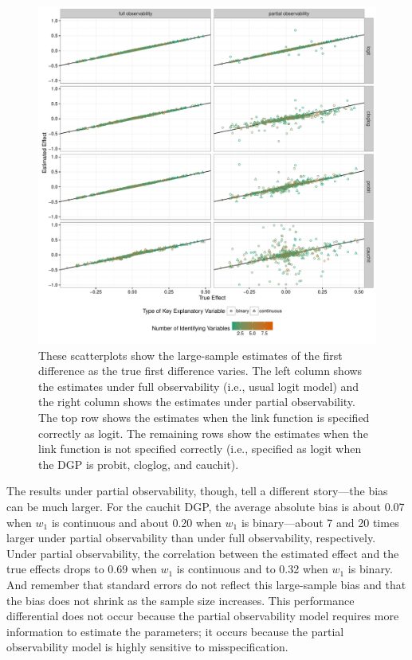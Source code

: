 \documentclass[10pt]{article}
\begin{document}
\begin{figure}[h]
\begin{center}
\includegraphics[scale = .6]{figs/link-sims-scatter.pdf}
\caption{These scatterplots show the large-sample estimates of the first difference as the true first difference varies. The left column shows the estimates under full observability (i.e., usual logit model) and the right column shows the estimates under partial observability. The top row shows the estimates when the link function is specified correctly as logit. The remaining rows show the estimates when the link function is not specified correctly (i.e., specified as logit when the DGP is probit, cloglog, and cauchit).}\label{fig:link}
\end{center}
\end{figure}

The results under partial observability, though, tell a different story---the bias can be much larger. 
For the cauchit DGP, the average absolute bias is about 0.07 when $w_1$ is continuous and about 0.20 when $w_1$ is binary---about 7 and 20 times larger under partial observability than under full observability, respectively. 
Under partial observability, the correlation between the estimated effect and the true effects drops to 0.69 when $w_1$ is continuous and to 0.32 when $w_1$ is binary.
And remember that standard errors do not reflect this large-sample bias and that the bias does not shrink as the sample size increases. 
This performance differential does not occur because the partial observability model requires more information to estimate the parameters; it occurs because the partial observability model is highly sensitive to misspecification. 
\end{document}
